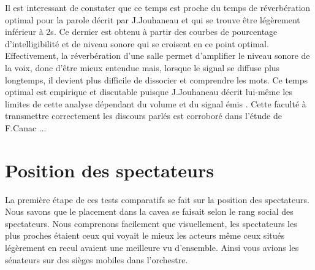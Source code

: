 Il est interessant de constater que ce temps est proche du temps de réverbération optimal pour la parole décrit par J.Jouhaneau \cite[p.209]{jouhaneau} et qui se trouve être légèrement inférieur à 2s. Ce dernier est obtenu à partir des courbes de pourcentage d'intelligibilité et de niveau sonore qui se croisent en ce point optimal. Effectivement, la réverbération d'une salle permet d'amplifier le niveau sonore de la voix, donc d'être mieux entendue mais, lorsque le signal se diffuse plus longtemps, il devient plus difficile de dissocier et comprendre les mots. Ce temps optimal est empirique et discutable puisque J.Jouhaneau décrit lui-même les limites de cette analyse dépendant du volume et du signal émis \cite[p.218]{jouhaneau}. Cette faculté à transmettre correctement les discours parlés est corroboré dans l'étude de F.Canac ...

\section{Position des spectateurs}
La première étape de ces tests comparatifs se fait sur la position des spectateurs. Nous savons que le placement dans la \gls{cavea} se faisait selon le rang social des spectateurs. Nous comprenons facilement que visuellement, les spectateurs les plus proches étaient ceux qui voyait le mieux les acteurs même ceux situés légèrement en recul avaient une meilleure vu d'ensemble. Ainsi vous avions les sénateurs sur des sièges mobiles dans l'orchestre.

